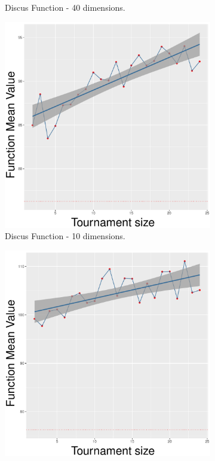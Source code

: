 \begin{figure}[!t]
\begin{subfigure}[b]{0.33\textwidth}
		\caption{Discus Function - 40 dimensions.}
	\end{subfigure}
	\caption{Uniform crossover - ($\lambda, \lambda$) scheme.}
	\label{uniform-11-a}
	\begin{subfigure}[b]{0.33\textwidth}
		\centering
		\includegraphics[width=\textwidth]{img/2n2n-10D/unimodal_2n2n_11_dim_10.pdf}
		\caption{Discus Function - 10 dimensions.}
	\end{subfigure}
	\begin{subfigure}[b]{0.33\textwidth}
		\centering
		\includegraphics[width=\textwidth]{img/2n2n-20D/unimodal_2n2n_11_dim_20.pdf}

\end{subfigure}
\end{figure}
